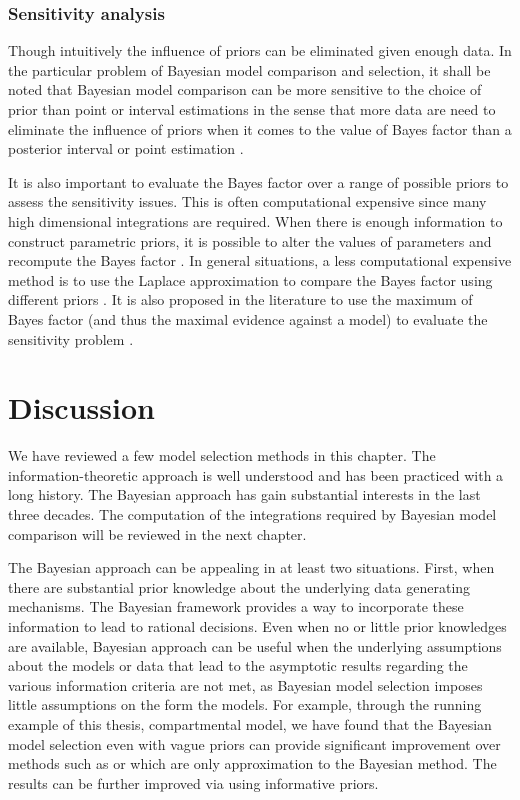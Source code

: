 

\subsubsection{Sensitivity analysis}
\label{ssub:Sensitivity analysis}

Though intuitively the influence of priors can be eliminated given enough
data. In the particular problem of Bayesian model comparison and selection, it
shall be noted that Bayesian model comparison can be more sensitive to the
choice of prior than point or interval estimations in the sense that more data
are need to eliminate the influence of priors when it comes to the value of
Bayes factor than a posterior interval or point estimation
\cite{Kass:1993vy,Kass:1995vb}.

It is also important to evaluate the Bayes factor over a range of possible
priors to assess the sensitivity issues. This is often computational expensive
since many high dimensional integrations are required. When there is enough
information to construct parametric priors, it is possible to alter the values
of parameters and recompute the Bayes factor \cite{McCulloch:1991hj}. In
general situations, a less computational expensive method is to use the
Laplace approximation to compare the Bayes factor using different priors
\cite{Kass:1992tz}. It is also proposed in the literature to use the maximum
of Bayes factor (and thus the maximal evidence against a model) to evaluate
the sensitivity problem \cite{Berger:1987iq}.

\section{Discussion}
\label{sec:Model Selection Discussion}

We have reviewed a few model selection methods in this chapter. The
information-theoretic approach is well understood and has been practiced with
a long history. The Bayesian approach has gain substantial interests in the
last three decades. The computation of the integrations required by Bayesian
model comparison will be reviewed in the next chapter.

The Bayesian approach can be appealing in at least two situations. First, when
there are substantial prior knowledge about the underlying data generating
mechanisms. The Bayesian framework provides a way to incorporate these
information to lead to rational decisions. Even when no or little prior
knowledges are available, Bayesian approach can be useful when the underlying
assumptions about the models or data that lead to the asymptotic results
regarding the various information criteria are not met, as Bayesian model
selection imposes little assumptions on the form the models. For example,
through the running example of this thesis, \pet compartmental model, we have
found that the Bayesian model selection even with vague priors can provide
significant improvement over methods such as \aicc or \bic which are only
approximation to the Bayesian method. The results can be further improved via
using informative priors.

